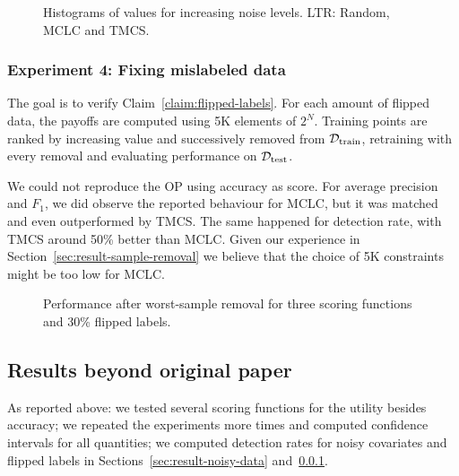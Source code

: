 \begin{figure}[h]
  \hspace*{-3mm}
  \caption{\label{fig:histograms-noisy}Histograms of values for increasing
  noise levels. LTR: Random, MCLC and TMCS.}
\end{figure}

\subsubsection{Experiment 4: Fixing mislabeled
data}\label{sec:result-flipped-labels}

The goal is to verify Claim~\ref{claim:flipped-labels}. For each amount of
flipped data, the payoffs are computed using 5K elements of $2^N$. Training
points are ranked by increasing value and successively removed from
$\mathcal{D}_{\operatorname{train}}$, retraining with every removal and evaluating
performance on $\mathcal{D}_{\operatorname{test}}$.

We could not reproduce the OP using accuracy as score. For average precision
and $F_1$, we did observe the reported behaviour for MCLC, but it was matched
and even outperformed by TMCS. The same happened for detection rate, with TMCS
around 50\% better than MCLC. Given our experience in
Section~\ref{sec:result-sample-removal} we believe that the choice of 5K
constraints might be too low for MCLC.

\begin{figure}[h]
  \hspace*{-3mm}
  \caption{Performance after worst-sample removal for three scoring functions
  and 30\% flipped labels.}
\end{figure}

\subsection{Results beyond original paper}

As reported above: we tested several scoring functions for the utility besides
accuracy; we repeated the experiments more times and computed confidence
intervals for all quantities; we computed detection rates for noisy covariates
and flipped labels in Sections~\ref{sec:result-noisy-data}
and~\ref{sec:result-flipped-labels}.

